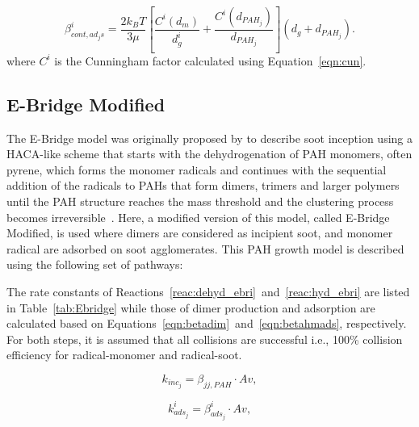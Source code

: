 \begin{equation}
	\beta^i_{cont, ad_js}=
		\frac{2 k_B T}{3 \mu}
		\left[
			\frac{C^i\left(d_m\right)}{d^i_g}+
			\frac{C^i\left(d_{PAH_j}\right)}{d_{PAH_j}}
		\right]
		\left(d_g+d_{PAH_j}\right).
	\label{eqn:betacontads}
\end{equation}
where $C^i$ is the Cunningham factor calculated using Equation~\eqref{eqn:cun}.

\subsection{E-Bridge Modified}
\label{sec:ebrimod}
The E-Bridge model was originally proposed by \citet{frenklach2020mechanism} to describe soot inception using a HACA-like scheme that starts with the dehydrogenation of PAH monomers, often pyrene, which forms the monomer radicals and continues with the sequential addition of the radicals to PAHs that form dimers, trimers and larger polymers until the PAH structure reaches the mass threshold and the clustering process becomes irreversible~\citep{frenklach2020mechanism}. Here, a modified version of this model, called E-Bridge Modified, is used where dimers are considered as incipient soot, and monomer radical are adsorbed on soot agglomerates. This PAH growth model is described using the following set of pathways:




The rate constants of Reactions~\eqref{reac:dehyd_ebri}~and~\eqref{reac:hyd_ebri} are listed in Table~\ref{tab:Ebridge} while those of dimer production and adsorption are calculated based on Equations~\eqref{eqn:betadim}~and~\eqref{eqn:betahmads}, respectively. For both steps, it is assumed that all collisions are successful i.e., 100\% collision efficiency for radical-monomer and radical-soot.

\begin{equation}
	k_{inc_j}=
	\beta_{jj,PAH}\cdot Av
	\label{eqn:kdim_ebri},
\end{equation}

\begin{equation}
	k^i_{ads_{j}}=
	\beta^i_{ads_j}\cdot Av
	\label{eqn:kads_ebir},
\end{equation}

